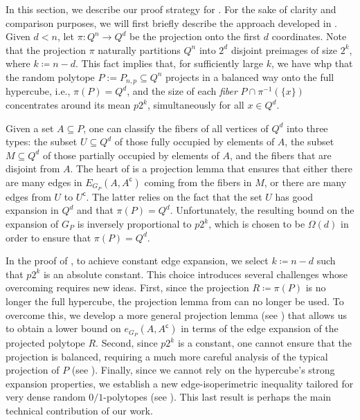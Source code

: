 \documentclass[11pt,a4paper,oneside,reqno]{amsart}
\begin{document}
In this section, we describe our proof strategy for . For the sake of clarity and comparison purposes, we will first briefly describe the approach developed in \cite{randomexppolytopes24}. Given $d<n$, let $\pi \colon Q^n \rightarrow Q^d$ be the projection onto the first $d$ coordinates.  Note that the projection $\pi$ naturally partitions $Q^n$ into $2^d$ disjoint preimages of size $2^{k}$, where $k \coloneqq n-d$.  This fact implies that, for sufficiently large  $k$, we have whp that the random polytope $P:=P_{n,p} \subseteq Q^n$ projects in a balanced way onto the full hypercube, i.e., $\pi(P) = Q^d$, and the size of each \emph{fiber} $P \cap \pi^{-1}(\{x\})$ concentrates around its mean $p2^k$, simultaneously for all $x \in Q^d$.

Given a set $A \subseteq P$, one can classify the fibers of all vertices of $Q^d$ into three types: the subset $U \subseteq Q^d$ of those fully occupied by elements of $A$, the subset $M \subseteq Q^d$ of those partially occupied by elements of $A$, and the fibers that are disjoint from $A$. The heart of \cite{randomexppolytopes24} is a projection lemma that ensures that either there are many edges in $E_{G_P}(A, A^\mathsf{c})$ coming from the fibers in $M$, or there are many edges from $U$ to $U^\mathsf{c}$. The latter relies on the fact that the set $U$ has good expansion in $Q^d$ and that $\pi(P) = Q^d$. Unfortunately, the resulting bound on the expansion of $G_P$ is inversely proportional to $p2^k$, which is chosen to be $\Omega(d)$ in order to ensure that $\pi(P) = Q^d$.

In the proof of , to achieve constant edge expansion, we select $k \coloneqq n-d$ such that $p2^k$ is an absolute constant.  This choice introduces several challenges whose overcoming requires new ideas. First, since the projection $R \coloneqq \pi(P)$ is no longer the full hypercube, the projection lemma from \cite{randomexppolytopes24} can no longer be used.  To overcome this, we develop a more general projection lemma (see ) that allows us to obtain a lower bound on $e_{G_P}(A, A^\mathsf{c})$ in terms of the edge expansion of the projected polytope $R$.  Second, since $p2^k$ is a constant, one cannot ensure that the projection is balanced, requiring a much more careful analysis of the typical projection of $P$ (see ). Finally, since we cannot rely on the hypercube's strong expansion properties, we establish a new edge-isoperimetric inequality tailored for very dense random $0/1$-polytopes (see ).  This last result is perhaps the main technical contribution of our work.
\end{document}
